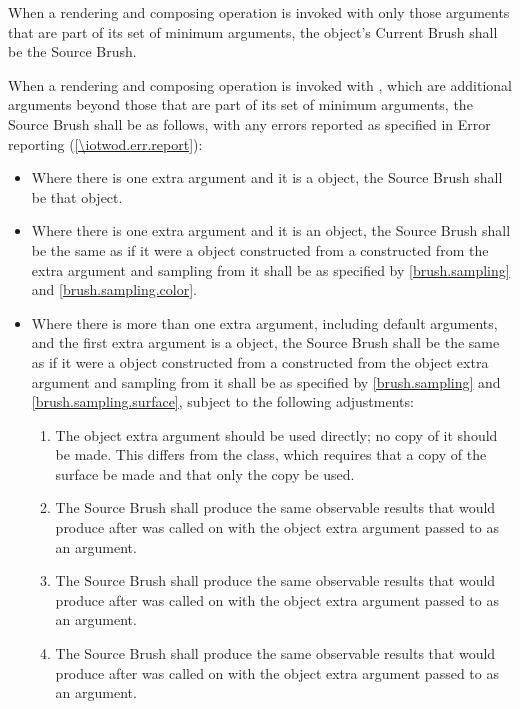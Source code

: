 \pnum
When a rendering and composing operation is invoked with only those arguments that are part of its set of minimum arguments, the  object's Current Brush shall be the Source Brush.

\pnum
When a rendering and composing operation is invoked with , which are additional arguments beyond those that are part of its set of minimum arguments, the Source Brush shall be as follows, with any errors reported as specified in Error reporting (\ref{\iotwod.err.report}):
\begin{itemize}
	\item Where there is one extra argument and it is a  object, the Source Brush shall be that  object.
	\item Where there is one extra argument and it is an  object, the Source Brush shall be the same as if it were a  object constructed from a  constructed from the extra argument and sampling from it shall be as specified by \ref{brush.sampling} and \ref{brush.sampling.color}.
	\item Where there is more than one extra argument, including default arguments, and the first extra argument is a  object, the Source Brush shall be the same as if it were a  object  constructed from a  constructed from the  object extra argument and sampling from it shall be as specified by \ref{brush.sampling} and \ref{brush.sampling.surface}, subject to the following adjustments:
	\begin{enumerate}
		\item The  object extra argument should be used directly; no copy of it should be made. This differs from the  class, which requires that a copy of the surface be made and that only the copy be used.
		\item The Source Brush shall produce the same observable results that  would produce after  was called on  with the  object extra argument passed to  as an argument.
		\item The Source Brush shall produce the same observable results that  would produce after  was called on  with the  object extra argument passed to  as an argument.
		\item The Source Brush shall produce the same observable results that  would produce after  was called on  with the  object extra argument passed to  as an argument.
	\end{enumerate}
\end{itemize}

